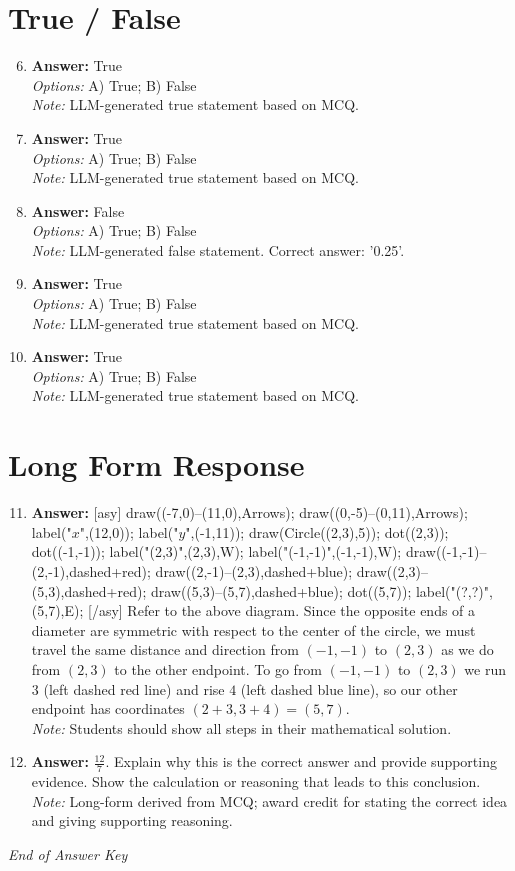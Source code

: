 \documentclass[12pt]{article}
\begin{document}
\section*{True / False}
\begin{enumerate}[label=\arabic*.]
\setcounter{enumi}{5}
\item \textbf{Answer:} True
\\ \textit{Options:} A) True; B) False
\\ \textit{Note:} LLM-generated true statement based on MCQ.
\item \textbf{Answer:} True
\\ \textit{Options:} A) True; B) False
\\ \textit{Note:} LLM-generated true statement based on MCQ.
\item \textbf{Answer:} False
\\ \textit{Options:} A) True; B) False
\\ \textit{Note:} LLM-generated false statement. Correct answer: '0.25'.
\item \textbf{Answer:} True
\\ \textit{Options:} A) True; B) False
\\ \textit{Note:} LLM-generated true statement based on MCQ.
\item \textbf{Answer:} True
\\ \textit{Options:} A) True; B) False
\\ \textit{Note:} LLM-generated true statement based on MCQ.
\end{enumerate}

\section*{Long Form Response}
\begin{enumerate}[label=\arabic*.]
\setcounter{enumi}{10}
\item \textbf{Answer:} [asy] draw((-7,0)--(11,0),Arrows); draw((0,-5)--(0,11),Arrows); label("$x$",(12,0)); label("$y$",(-1,11)); draw(Circle((2,3),5)); dot((2,3)); dot((-1,-1)); label("(2,3)",(2,3),W); label("(-1,-1)",(-1,-1),W); draw((-1,-1)--(2,-1),dashed+red); draw((2,-1)--(2,3),dashed+blue); draw((2,3)--(5,3),dashed+red); draw((5,3)--(5,7),dashed+blue); dot((5,7)); label("(?,?)",(5,7),E); [/asy] Refer to the above diagram. Since the opposite ends of a diameter are symmetric with respect to the center of the circle, we must travel the same distance and direction from $(-1,-1)$ to $(2,3)$ as we do from $(2,3)$ to the other endpoint. To go from $(-1,-1)$ to $(2,3)$ we run $3$ (left dashed red line) and rise $4$ (left dashed blue line), so our other endpoint has coordinates $(2+3,3+4)=\boxed{(5,7)}$.
\\ \textit{Note:} Students should show all steps in their mathematical solution.
\item \textbf{Answer:} \ensuremath{\frac{12}{7}}. Explain why this is the correct answer and provide supporting evidence. Show the calculation or reasoning that leads to this conclusion.
\\ \textit{Note:} Long-form derived from MCQ; award credit for stating the correct idea and giving supporting reasoning.
\end{enumerate}

\vfill
\noindent\textit{End of Answer Key}
\end{document}

